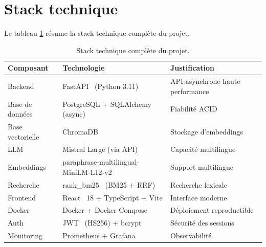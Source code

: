 \documentclass[12pt,a4paper,oneside]{report}
\begin{document}
\section{Stack technique}



Le tableau \ref{tab:stack} r\'{e}sume la stack technique compl\`{e}te du projet.



\begin{table}[htbp]\centering

\begin{tabular}{@{}lp{5.5cm}p{5.5cm}@{}}

\toprule

\textbf{Composant} & \textbf{Technologie} & \textbf{Justification} \\

\midrule

Backend & FastAPI~\cite{fastapi} (Python 3.11) & API asynchrone haute performance \\

Base de donn\'{e}es & PostgreSQL + SQLAlchemy~\cite{sqlalchemy} (async) & Fiabilit\'{e} ACID \\

Base vectorielle & ChromaDB~\cite{chromadb} & Stockage d'embeddings \\

LLM & Mistral Large (via API) & Capacit\'{e} multilingue \\

Embeddings & paraphrase-multilingual-MiniLM-L12-v2~\cite{minilm} & Support multilingue \\

Recherche & rank\_bm25~\cite{rank_bm25} (BM25 + RRF) & Recherche lexicale \\

Frontend & React~\cite{react} 18 + TypeScript + Vite & Interface moderne \\

Docker & Docker + Docker Compose & D\'{e}ploiement reproductible \\

Auth & JWT~\cite{pyjwt} (HS256) + bcrypt & S\'{e}curit\'{e} des sessions \\

Monitoring & Prometheus + Grafana & Observabilit\'{e} \\

\bottomrule

\end{tabular}

\caption{Stack technique compl\`{e}te du projet.}\label{tab:stack}

\end{table}
\end{document}
